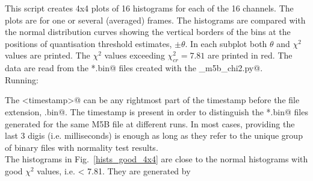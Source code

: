\documentclass[letterpaper,twoside,12pt]{article}
\begin{document}
This script creates 4x4 plots of 16 histograms for each of the 16 channels. The plots are for one or several (averaged) frames. The histograms are compared with the normal distribution curves showing the vertical borders of the bins at the positions of quantisation threshold estimates, $\pm\theta$. In each subplot both $\theta$ and $\chi^2$ values are printed. The $\chi^2$ values exceeding $\chi^2_{cr} = 7.81$ are printed in red. The data are read from the \verb@*.bin@ files created with the \verb@gpu_m5b_chi2.py@. \\

\noindent Running: \\

\noindent \verb@%run inspect_nt.py <m5b_filename> <timestamp> <start_frame_#> <#_of_frames> @ \\

The \verb@<timestamp>@ can be any rightmost part of the timestamp before the file extension, \verb@.bin@. The timestamp is present in order to distinguish the \verb@*.bin@ files generated for the same M5B file at different runs. In most cases, providing the last 3 digis (i.e. milliseconds) is enough as long as they refer to the unique group of binary files with normality test results. \\

The histograms in Fig.~\ref{hists_good_4x4} are close to the normal histograms with good $\chi^2$ values, i.e. < 7.81. They are generated by \\

\noindent \verb@%run inspect_nt.py rd1910_wz_268-1811.m5b 575 1000 1@. \\
\end{document}
